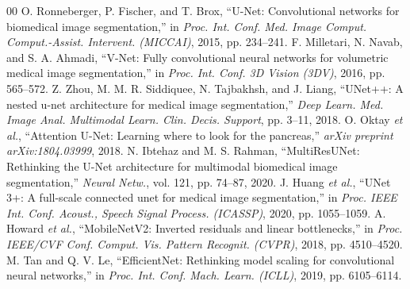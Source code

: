 \documentclass[conference]{IEEEtran}
\begin{document}
\begin{thebibliography}{00}
 O. Ronneberger, P. Fischer, and T. Brox, ``U-Net: Convolutional networks for biomedical image segmentation,'' in \emph{Proc. Int. Conf. Med. Image Comput. Comput.-Assist. Intervent. (MICCAI)}, 2015, pp. 234--241.
 F. Milletari, N. Navab, and S. A. Ahmadi, ``V-Net: Fully convolutional neural networks for volumetric medical image segmentation,'' in \emph{Proc. Int. Conf. 3D Vision (3DV)}, 2016, pp. 565--572.
 Z. Zhou, M. M. R. Siddiquee, N. Tajbakhsh, and J. Liang, ``UNet++: A nested u-net architecture for medical image segmentation,'' \emph{Deep Learn. Med. Image Anal. Multimodal Learn. Clin. Decis. Support}, pp. 3--11, 2018.
 O. Oktay \emph{et al.}, ``Attention U-Net: Learning where to look for the pancreas,'' \emph{arXiv preprint arXiv:1804.03999}, 2018.
 N. Ibtehaz and M. S. Rahman, ``MultiResUNet: Rethinking the U-Net architecture for multimodal biomedical image segmentation,'' \emph{Neural Netw.}, vol. 121, pp. 74--87, 2020.
 J. Huang \emph{et al.}, ``UNet 3+: A full-scale connected unet for medical image segmentation,'' in \emph{Proc. IEEE Int. Conf. Acoust., Speech Signal Process. (ICASSP)}, 2020, pp. 1055--1059.
 A. Howard \emph{et al.}, ``MobileNetV2: Inverted residuals and linear bottlenecks,'' in \emph{Proc. IEEE/CVF Conf. Comput. Vis. Pattern Recognit. (CVPR)}, 2018, pp. 4510--4520.
 M. Tan and Q. V. Le, ``EfficientNet: Rethinking model scaling for convolutional neural networks,'' in \emph{Proc. Int. Conf. Mach. Learn. (ICLL)}, 2019, pp. 6105--6114.
\end{thebibliography}
\end{document}
